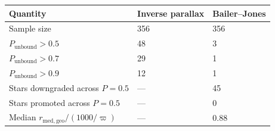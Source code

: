 \begin{tabular}{lll}
\toprule
Quantity & Inverse parallax & Bailer--Jones \\
\midrule
Sample size & 356 & 356 \\
$P_{\mathrm{unbound}} > 0.5$ & 48 & 3 \\
$P_{\mathrm{unbound}} > 0.7$ & 29 & 1 \\
$P_{\mathrm{unbound}} > 0.9$ & 12 & 1 \\
Stars downgraded across $P=0.5$ & --- & 45 \\
Stars promoted across $P=0.5$ & --- & 0 \\
Median $r_{\mathrm{med,geo}}/(1000/\varpi)$ & --- & 0.88 \\
\bottomrule
\end{tabular}
